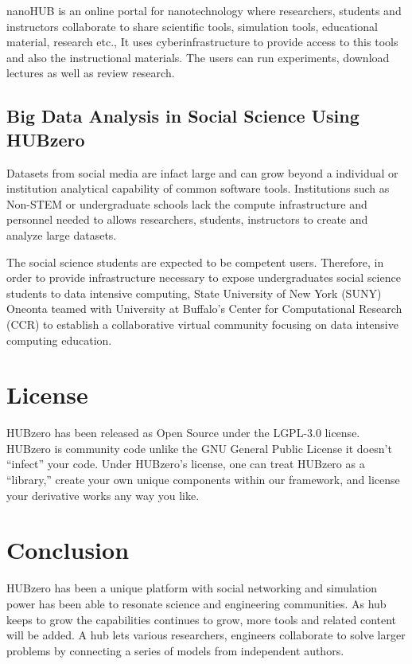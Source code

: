 \documentclass[9pt,twocolumn,twoside]{../../styles/osajnl}
\begin{document}
nanoHUB is an online portal for nanotechnology where researchers,
students and instructors collaborate to share scientific tools,
simulation tools, educational material, research etc., It uses
cyberinfrastructure to provide access to this tools and also the
instructional materials. The users can run experiments, download
lectures as well as review research\cite{klimeck2008nanohub}.

\subsection{Big Data Analysis in Social Science Using HUBzero}
Datasets from social media are infact large and can grow beyond a
individual or institution analytical capability of common software
tools. Institutions such as Non-STEM or undergraduate schools lack the
compute infrastructure and personnel needed to allows researchers,
students, instructors to create and analyze large datasets.

The social science students are expected to be competent
users. Therefore, in order to provide infrastructure necessary to
expose undergraduates social science students to data intensive
computing, State University of New York (SUNY) Oneonta teamed with
University at Buffalo's Center for Computational Research (CCR) to
establish a collaborative virtual community focusing on data intensive
computing education\cite{BigDataApplication}.

\section{License}
HUBzero has been released as Open Source under the LGPL-3.0
license. HUBzero is community code unlike the GNU General Public
License it doesn't ``infect'' your code. Under HUBzero's license, one
can treat HUBzero as a “library,” create your own unique components
within our framework, and license your derivative works any way you
like.

\section{Conclusion}
HUBzero has been a unique platform with social networking and
simulation power has been able to resonate science and engineering
communities. As hub keeps to grow the capabilities continues to grow,
more tools and related content will be added. A hub lets various
researchers, engineers collaborate to solve larger problems by
connecting a series of models from independent authors.






 


\newpage

\appendix
\end{document}
